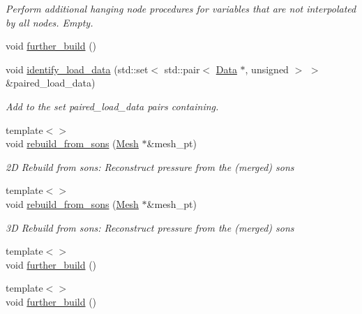 \begin{DoxyCompactItemize}
\begin{DoxyCompactList}\small\item\em Perform additional hanging node procedures for variables that are not interpolated by all nodes. Empty. \end{DoxyCompactList}\item 
void \hyperlink{classoomph_1_1RefineableGeneralisedNewtonianQCrouzeixRaviartElement_ab98f5825068568b99dd2f744a3e2afb3}{further\+\_\+build} ()
\item 
void \hyperlink{classoomph_1_1RefineableGeneralisedNewtonianQCrouzeixRaviartElement_a14c12617fd3fe6ea248c2ec54993b0a5}{identify\+\_\+load\+\_\+data} (std\+::set$<$ std\+::pair$<$ \hyperlink{classoomph_1_1Data}{Data} $\ast$, unsigned $>$ $>$ \&paired\+\_\+load\+\_\+data)
\begin{DoxyCompactList}\small\item\em Add to the set {\ttfamily paired\+\_\+load\+\_\+data} pairs containing. \end{DoxyCompactList}\item 
{\footnotesize template$<$$>$ }\\void \hyperlink{classoomph_1_1RefineableGeneralisedNewtonianQCrouzeixRaviartElement_a526ff9b95eb0f7628e00cc72f901c32e}{rebuild\+\_\+from\+\_\+sons} (\hyperlink{classoomph_1_1Mesh}{Mesh} $\ast$\&mesh\+\_\+pt)
\begin{DoxyCompactList}\small\item\em 2D Rebuild from sons\+: Reconstruct pressure from the (merged) sons \end{DoxyCompactList}\item 
{\footnotesize template$<$$>$ }\\void \hyperlink{classoomph_1_1RefineableGeneralisedNewtonianQCrouzeixRaviartElement_ab52f6e7dbb9ddcd739af537607ef1d1a}{rebuild\+\_\+from\+\_\+sons} (\hyperlink{classoomph_1_1Mesh}{Mesh} $\ast$\&mesh\+\_\+pt)
\begin{DoxyCompactList}\small\item\em 3D Rebuild from sons\+: Reconstruct pressure from the (merged) sons \end{DoxyCompactList}\item 
{\footnotesize template$<$$>$ }\\void \hyperlink{classoomph_1_1RefineableGeneralisedNewtonianQCrouzeixRaviartElement_a4e9f97f8423604d44da0843a46bb797d}{further\+\_\+build} ()
\item 
{\footnotesize template$<$$>$ }\\void \hyperlink{classoomph_1_1RefineableGeneralisedNewtonianQCrouzeixRaviartElement_ab6ba5ac30da8e91baa12c59d7805f6e5}{further\+\_\+build} ()
\end{DoxyCompactItemize}
